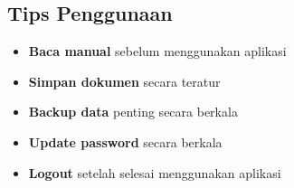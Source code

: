 \documentclass[12pt,a4paper]{article}
\begin{document}
\subsection{Tips Penggunaan}
\begin{itemize}
\item \textbf{Baca manual} sebelum menggunakan aplikasi
\item \textbf{Simpan dokumen} secara teratur
\item \textbf{Backup data} penting secara berkala
\item \textbf{Update password} secara berkala
\item \textbf{Logout} setelah selesai menggunakan aplikasi
\end{itemize}
\end{document}
